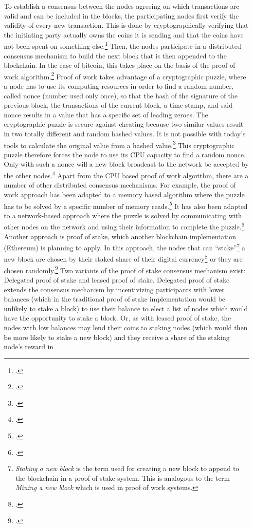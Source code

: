 To establish a consensus between the nodes agreeing on which transactions are valid and can be included in the blocks, the participating nodes first verify the validity of every new transaction. This is done by cryptographically verifying that the initiating party actually owns the coins it is sending and that the coins have not been spent on something else.\footcite[Cf.][p.68]{AntonopolousAndreasM..2017} Then, the nodes participate in a distributed consensus mechanism to build the next block that is then appended to the blockchain. In the case of bitcoin, this takes place on the basis of the proof of work algorithm.\footcites[Cf.][]{Dwork.1993}[cf.][p.3]{Nakamoto.2008} Proof of work takes advantage of a cryptographic puzzle, where a node has to use its computing resources in order to find a random number, called nonce (number used only once), so that the hash of the signature of the previous block, the transactions of the current block, a time stamp, and said nonce results in a value that has a specific set of leading zeroes. The cryptographic puzzle is secure against cheating because two similar values result in two totally different and random hashed values. It is not possible with today's tools to calculate the original value from a hashed value.\footcite[Cf.][p.12]{SwanBlockchainblueprintnew2015} This cryptographic puzzle therefore forces the node to use its CPU capacity to find a random nonce. Only with such a nonce will a new block broadcast to the network be accepted by the other nodes.\footcites[Cf.][p.8]{Nakamoto.2008}[cf.][p.12]{Schutte.2017} Apart from the CPU based proof of work algorithm, there are a number of other distributed consensus mechanisms. For example, the proof of work approach has been adapted to a memory based algorithm where the puzzle has to be solved by a specific number of memory reads.\footcite[Cf.][]{Abadi.2005} It has also been adapted to a network-based approach where the puzzle is solved by communicating with other nodes on the network and using their information to complete the puzzle.\footcite[Cf.][]{Abliz.2009} Another approach is proof of stake, which another blockchain implementation (Ethereum) is planning to apply. In this approach, the nodes that can \enquote{stake}\footnote{\textit{Staking a  new block} is the term used for creating a new block to append to the blockchain in a proof of stake system. This is analogous to the term \textit{Mining a new block} which is used in proof of work systems.} a new block are chosen by their staked share of their digital currency\footcite[Cf.][]{King.2012} or they are chosen randomly.\footcites[Cf.][]{w.A..2016}[cf.][p.200]{AntonopolousAndreasM..2017}[cf.][p.11 et seq]{Schlatt.2016} Two variants of the proof of stake consensus mechanism exist: Delegated proof of stake and leased proof of stake. Delegated proof of stake extends the consensus mechanism by incentivizing participants with lower balances (which in the traditional proof of stake implementation would be unlikely to stake a block) to use their balance to elect a list of nodes which would have the opportunity to stake a block. Or, as with leased proof of stake, the nodes with low balances may lend their coins to staking nodes (which would then be more likely to stake a new block) and they receive a share of the staking node's reward in 